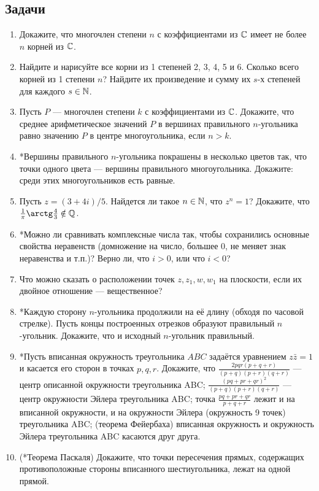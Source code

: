 
\subsection*{Задачи}

\begin{enumerate}
\item  Докажите, что многочлен степени $n$ с коэффициентами из $\mathbb C$ имеет не более $n$ корней из $\mathbb C$.
\item  \ipunkt  Найдите и нарисуйте все корни из 1 степеней 2, 3, 4, 5 и 6. \ipunkt  Сколько всего корней из 1
степени $n$? Найдите их произведение и сумму их $s$-х степеней для каждого $s \in \mathbb N$.
\item  Пусть $P$ — многочлен степени $k$ с коэффициентами из $\mathbb C$. Докажите, что среднее арифметическое
значений $P$ в вершинах правильного $n$-угольника равно значению $P$ в центре многоугольника, если $n > k$.
\item  *Вершины правильного $n$-угольника покрашены в несколько цветов так, что точки одного цвета —
вершины правильного многоугольника. Докажите: среди этих многоугольников есть равные.
\item 
 \ipunkt  Пусть $z = (3 + 4i)/5$. Найдется ли такое $n \in \mathbb N$, что $z^n = 1$? \ipunkt  Докажите, что
 $\frac{1}{\pi}\arctg \frac43 \notin \Q$.
\item *Можно ли сравнивать комплексные числа так, чтобы сохранились основные свойства неравенств
(домножение на число, большее 0, не меняет знак неравенства и т.п.)? Верно ли, что $i > 0$, или что $i < 0$?
\item Что можно сказать о расположении точек $z,z_1,w,w_1$ на плоскости, если их двойное отношение --- вещественное?

\item *Каждую сторону $n$-угольника продолжили на её длину (обходя по часовой стрелке). Пусть концы
построенных отрезков образуют правильный $n$-угольник. Докажите, что и исходный $n$-угольник правильный.
\item *Пусть вписанная окружность треугольника $ABC$ задаётся уравнением $z\bar z = 1$ и касается его 
сторон в точках $p, q, r$. Докажите, что \ipunkt $\frac{2pqr(p+q+r)}{(p+q)(p+r)(q+r)}$ --- центр описанной окружности треугольника ABC; \ipunkt $\frac{(pq+pr+qr)^2}{(p+q)(p+r)(q+r)}$ --- центр окружности Эйлера треугольника ABC; \ipunkt точка $\frac{pq+pr+qr}{p+q+r}$ лежит и на вписанной окружности, и на окружности Эйлера (окружность 9 точек) треугольника ABC; \ipunkt (теорема Фейербаха) вписанная окружность и окружность Эйлера треугольника ABC касаются друг друга.
\item (*Теорема Паскаля) Докажите, что точки пересечения прямых, содержащих противоположные
 стороны вписанного шестиугольника, лежат на одной прямой.

\end{enumerate}





